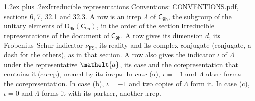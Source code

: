 \documentclass[10pt,a4paper]{article}
\makeatletter
\renewcommand\section{\@startsection{section}{1}{\z@}{-3ex plus -1ex minus -.2ex}%
  {1.2ex plus .2ex}{\normalfont\large\sffamily\bfseries\color{parttitle}}}
\numberwithin{equation}{section}
\newcommand{\eltfont}[1]{{\let\sigma\eltsigma\mathelt{#1}}}
\newcommand{\grp}[1]{\mathsf{#1}}
\newcommand{\elt}[1]{\eltfont{#1}}
\newcommand{\fsind}{\nu_{\mathrm{FS}}}
\makeatother
\begin{document}
\section{Irreducible representations}\label{s:irreps}
Conventions: \href{../../CONVENTIONS.pdf}{CONVENTIONS.pdf}, sections \href{../../../rotation/CONVENTIONS.pdf\#conv.6}{6}, \href{../../../rotation/CONVENTIONS.pdf\#conv.7}{7}, \href{../../CONVENTIONS.pdf\#conv.32.1}{32.1} and \href{../../CONVENTIONS.pdf\#conv.32.3}{32.3}.
\leavevmode\label{n:irrep.Delta}A row is an irrep $\Lambda$ of $\grp{C_{9h}}$, the subgroup of the unitary elements of $\grp{D_{9h}}(\grp{C_{9h}})$, in the order of the section Irreducible representations of the document of \href{../../../rotation/data/pdf/C9h.pdf}{$\grp{C_{9h}}$}. \label{n:index.dimension}\label{n:index.frobenius}\label{n:head.irrep}\label{n:head.reality}\label{n:head.conjugate}A row gives its dimension $d$, its Frobenius--Schur indicator $\fsind$, its reality and its complex conjugate (conjugate, a dash for the others), as in that section. \label{n:head.case.corep}\label{n:head.corep}A row also gives the indicator $\iota$ of $\Lambda$ under the representative $\elt{a}$, its case and the corepresentation that contains it (corep), named by its irreps. In case (a), $\iota = +1$ and $\Lambda$ alone forms the corepresentation. In case (b), $\iota = -1$ and two copies of $\Lambda$ form it. In case (c), $\iota = 0$ and $\Lambda$ forms it with its partner, another irrep.
\setlength{\emergencystretch}{2em}\par\setlength{\emergencystretch}{0pt}
\end{document}
